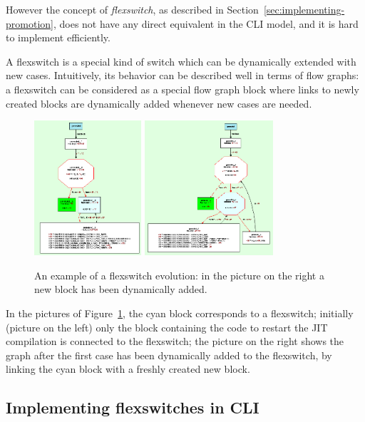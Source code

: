 However the concept of \emph{flexswitch}, as described in
Section~\ref{sec:implementing-promotion}, does not have any direct equivalent
in the CLI model, and it is hard to implement efficiently.

A flexswitch is a special kind of switch which can be dynamically
extended with new cases.  Intuitively, its behavior can be described
well in terms of flow graphs: a flexswitch can be considered 
as a special flow graph block where links to newly created blocks are
dynamically added whenever new cases are needed. 

\begin{figure}[h]
\begin{center}
\includegraphics[height=5cm]{flexswitch1}
\includegraphics[height=5cm]{flexswitch2}
\caption{An example of a flexswitch evolution: in the picture on the
  right a new block has been dynamically added.}\label{flexswitch-fig}
\end{center}
\end{figure}

In the pictures of Figure~\ref{flexswitch-fig}, the cyan block
corresponds to a flexswitch; initially (picture on the left) 
only the block containing the code to restart the JIT compilation
is connected to the flexswitch; the picture on the right
shows the graph after the first case has been dynamically added to the flexswitch,
by linking the cyan block with a freshly created new block.


\subsection{Implementing flexswitches in CLI}
\label{sec:flexswitches-cli}

